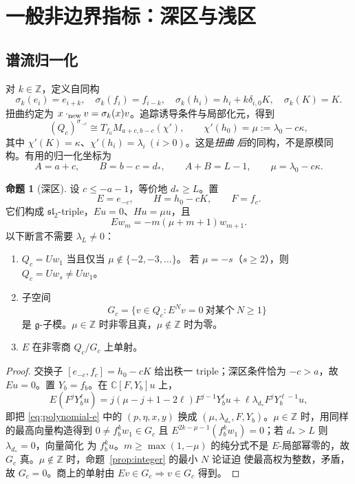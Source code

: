 \documentclass[UTF8,11pt]{ctexart}
\newcommand{\C}{\mathbb C}
\newcommand{\Z}{\mathbb Z}
\newcommand{\g}{\mathfrak g}
\newcommand{\slc}{\mathfrak{sl}_2}
\theoremstyle{definition}
\newtheorem{proposition}{命题}[section]
\begin{document}
\section{一般非边界指标：深区与浅区}\label{sec:deep}

\subsection{谱流归一化}

对 \(k\in\Z\)，定义自同构
\[
\sigma_k(e_i)=e_{i+k},\quad
\sigma_k(f_i)=f_{i-k},\quad
\sigma_k(h_i)=h_i+k\delta_{i,0}K,\quad
\sigma_k(K)=K.
\]
扭曲约定为 \(x\cdot_{\rm new}v=\sigma_k(x)v\)。追踪诱导条件与局部化元，得到
\begin{equation}\label{eq:spectral}
(Q_c)^{\sigma_{-c}}\cong
T_{f_0}M_{a+c,b-c}(\chi'),
\qquad
\chi'(h_0)=\mu:=\lambda_0-c\kappa,
\end{equation}
其中 \(\chi'(K)=\kappa\)、\(\chi'(h_i)=\lambda_i\ (i>0)\)。这是\emph{扭曲
后}的同构，不是原模同构。有用的归一化坐标为
\[
A=a+c,\qquad B=b-c=d_*,\qquad A+B=L-1,\qquad \mu=\lambda_0-c\kappa.
\]

\begin{proposition}[深区]\label{prop:deep}
设 \(c\le-a-1\)，等价地 \(d_*\ge L\)。置
\[
E=e_{-c},\qquad H=h_0-cK,\qquad F=f_c.
\]
它们构成 \(\slc\)-triple，\(Eu=0\)、\(Hu=\mu u\)，且
\[
Ew_m=-m(\mu+m+1)w_{m+1}.
\]
以下断言不需要 \(\lambda_L\ne0\)：
\begin{enumerate}[label=(\roman*)]
\item \(Q_c=Uw_1\) 当且仅当 \(\mu\notin\{-2,-3,\ldots\}\)。
若 \(\mu=-s\)（\(s\ge2\)），则 \(Q_c=Uw_s\ne Uw_1\)。
\item 子空间
\[
G_c=\{v\in Q_c:E^Nv=0\ \text{对某个}\ N\ge1\}
\]
是 \(\g\)-子模。\(\mu\in\Z\) 时非零且真，\(\mu\notin\Z\) 时为零。
\item \(E\) 在非零商 \(Q_c/G_c\) 上单射。
\end{enumerate}
\end{proposition}

\begin{proof}
交换子 \([e_{-c},f_c]=h_0-cK\) 给出秩一 triple；深区条件恰为 \(-c>a\)，故
\(Eu=0\)。置 \(Y_b=f_b\)。在 \(\C[F,Y_b]u\) 上，
\begin{equation}\label{eq:deep-poly}
E(F^jY_b^\ell u)
=j(\mu-j+1-2\ell)F^{j-1}Y_b^\ell u
+\ell\lambda_{d_*}F^jY_b^{\ell-1}u,
\end{equation}
即把 \eqref{eq:polynomial-e} 中的
\((p,\eta,x,y)\) 换成 \((\mu,\lambda_{d_*},F,Y_b)\)。\(\mu\in\Z\) 时，用同样
的最高向量构造得到 \(0\ne f_b^kw_1\in G_c\) 且
\(E^{2k-\mu-1}(f_b^kw_1)=0\)；若 \(d_*>L\) 则 \(\lambda_{d_*}=0\)，向量简化
为 \(f_b^ku\)。\(m\ge\max(1,-\mu)\) 的纯分式不是 \(E\)-局部幂零的，故
\(G_c\) 真。\(\mu\notin\Z\) 时，命题~\ref{prop:integer} 的最小 \(N\) 论证迫
使最高权为整数，矛盾，故 \(G_c=0\)。商上的单射由
\(Ev\in G_c\Rightarrow v\in G_c\) 得到。
\end{proof}
\end{document}
